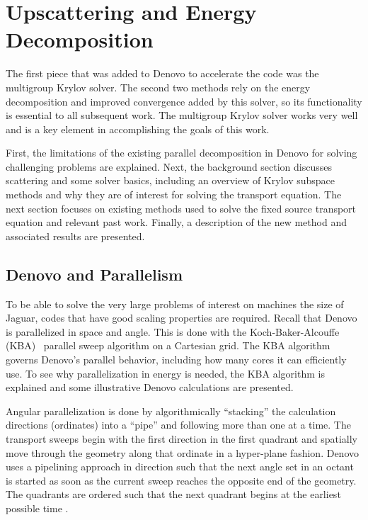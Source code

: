 
\chapter{Upscattering and Energy Decomposition}
\label{sec:Chp2}
The first piece that was added to Denovo to accelerate the code was the multigroup Krylov solver. The second two methods rely on the energy decomposition and improved convergence added by this solver, so its functionality is essential to all subsequent work. The multigroup Krylov solver works very well and is a key element in accomplishing the goals of this work. 

First, the limitations of the existing parallel decomposition in Denovo for solving challenging problems are explained. Next, the background section discusses scattering and some solver basics, including an overview of Krylov subspace methods and why they are of interest for solving the transport equation. The next section focuses on existing methods used to solve the fixed source transport equation and relevant past work. Finally, a description of the new method and associated results are presented.

\section{Denovo and Parallelism}
\label{sec:DenAndPar}
To be able to solve the very large problems of interest on machines the size of Jaguar, codes that have good scaling properties are required. Recall that Denovo is parallelized in space and angle. This is done with the Koch-Baker-Alcouffe (KBA)~\cite{Baker1998} parallel sweep algorithm on a Cartesian grid. The KBA algorithm governs Denovo's parallel behavior, including how many cores it can efficiently use. To see why parallelization in energy is needed, the KBA algorithm is explained and some illustrative Denovo calculations are presented.

Angular parallelization is done by algorithmically ``stacking'' the calculation directions (ordinates) into a ``pipe'' and following more than one at a time. The transport sweeps begin with the first direction in the first quadrant and spatially move through the geometry along that ordinate in a hyper-plane fashion. Denovo uses a pipelining approach in direction such that the next angle set in an octant is started as soon as the current sweep reaches the opposite end of the geometry. The quadrants are ordered such that the next quadrant begins at the earliest possible time \cite{Evans2009d}. 

